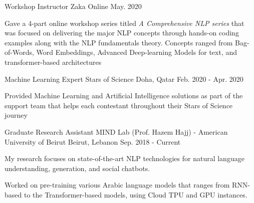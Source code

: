 

\begin{cventries}

  \cventry
    {Workshop Instructor} %
    {Zaka} %
    {Online} %
    {May. 2020} %
    { 
      \begin{cvitems} %
        \item {Gave a 4-part online workshop series titled \textit{A Comprehensive NLP series} that was focused on delivering the major NLP concepts through hands-on coding examples along with the NLP fundamentals theory. Concepts ranged from Bag-of-Words, Word Embeddings, Advanced Deep-learning Models for text, and transformer-based architectures}
      \end{cvitems}
    }
  \cventry
    {Machine Learning Expert} %
    {Stars of Science} %
    {Doha, Qatar} %
    {Feb. 2020 - Apr. 2020} %
    { 
      \begin{cvitems} %
        \item {Provided Machine Learning and Artificial Intelligence solutions as part of the support team that helps each contestant throughout their Stars of Science journey}
      \end{cvitems}
    }
  \cventry
    {Graduate Research Assistant} %
    {MIND Lab (Prof. Hazem Hajj) - American University of Beirut} %
    {Beirut, Lebanon} %
    {Sep. 2018 - Current} %
    {
      \begin{cvitems} %
        \item {My research focuses on state-of-the-art NLP technologies for natural language understanding, generation, and social chatbots.}
        \item {Worked on pre-training various Arabic language models that ranges from RNN-based to the Transformer-based models, using Cloud TPU and GPU instances.}
      \end{cvitems}
    }


\end{cventries}
